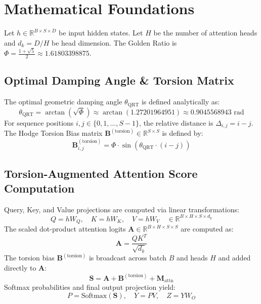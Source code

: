 \section{Mathematical Foundations}
Let $h \in \mathbb{R}^{B \times S \times D}$ be input hidden states. Let $H$ be the number of attention heads and $d_k = D / H$ be head dimension. The Golden Ratio is $\Phi = \frac{1+\sqrt{5}}{2} \approx 1.61803398875$.

\subsection{Optimal Damping Angle \& Torsion Matrix}
The optimal geometric damping angle $\theta_{\text{QRT}}$ is defined analytically as:
\begin{equation}
    \theta_{\text{QRT}} = \arctan(\sqrt{\Phi}) \approx \arctan(1.27201964951) \approx 0.9045568943\text{ rad}
\end{equation}
For sequence positions $i, j \in \{0, 1, \dots, S-1\}$, the relative distance is $\Delta_{i,j} = i - j$. The Hodge Torsion Bias matrix $\mathbf{B}^{(\text{torsion})} \in \mathbb{R}^{S \times S}$ is defined by:
\begin{equation}
    \mathbf{B}_{i,j}^{(\text{torsion})} = \Phi \cdot \sin(\theta_{\text{QRT}} \cdot (i - j))
\end{equation}

\subsection{Torsion-Augmented Attention Score Computation}
Query, Key, and Value projections are computed via linear transformations:
\begin{equation}
    Q = h W_Q, \quad K = h W_K, \quad V = h W_V \quad \in \mathbb{R}^{B \times H \times S \times d_k}
\end{equation}
The scaled dot-product attention logits $\mathbf{A} \in \mathbb{R}^{B \times H \times S \times S}$ are computed as:
\begin{equation}
    \mathbf{A} = \frac{Q K^T}{\sqrt{d_k}}
\end{equation}
The torsion bias $\mathbf{B}^{(\text{torsion})}$ is broadcast across batch $B$ and heads $H$ and added directly to $\mathbf{A}$:
\begin{equation}
    \mathbf{S} = \mathbf{A} + \mathbf{B}^{(\text{torsion})} + \mathbf{M}_{\text{attn}}
\end{equation}
Softmax probabilities and final output projection yield:
\begin{equation}
    P = \text{Softmax}(\mathbf{S}), \quad Y = P V, \quad Z = Y W_O
\end{equation}